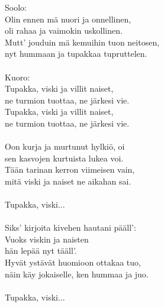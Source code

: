
Soolo: \\ Olin ennen mä nuori ja onnellinen, \\ oli rahaa ja vaimokin uskollinen. \\ Mutt' jouduin mä kemuihin tuon neitosen, \\ nyt hummaan ja tupakkaa tupruttelen. \\ \hspace{10mm} \\ Kuoro: \\ Tupakka, viski ja villit naiset, \\ ne turmion tuottaa, ne järkesi vie. \\ Tupakka, viski ja villit naiset, \\ ne turmion tuottaa, ne järkesi vie. \\ \hspace{10mm} \\ Oon kurja ja murtunut hylkiö, oi \\ sen kasvojen kurtuista lukea voi. \\ Tään tarinan kerron viimeisen vain, \\ mitä viski ja naiset ne aikahan sai. \\ \hspace{10mm} \\ Tupakka, viski... \\ \hspace{10mm} \\ Siks' kirjoita kivehen hautani pääll': \\ Vuoks viskin ja naisten \\ hän lepää nyt tääll'. \\ Hyvät ystävät huomioon ottakaa tuo, \\ näin käy jokaiselle, ken hummaa ja juo. \\ \hspace{10mm} \\ Tupakka, viski...
